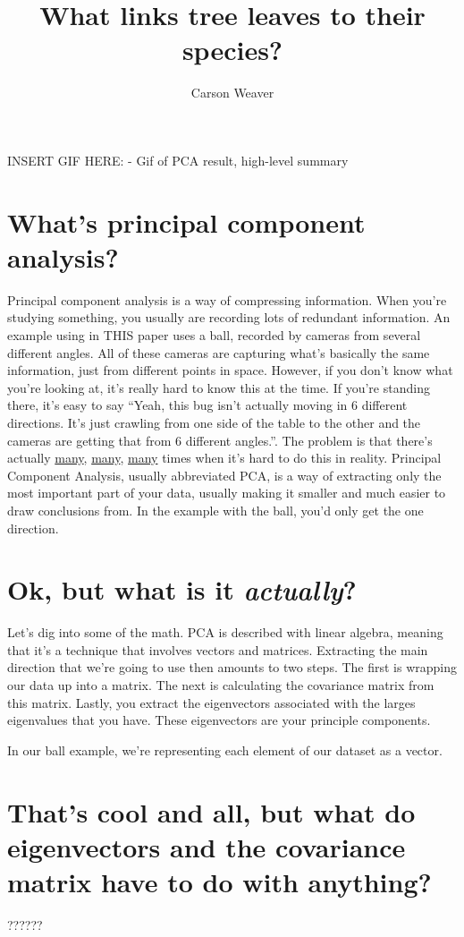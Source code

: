 \documentclass{article}
\title{What links tree leaves to their species?}
\author{Carson Weaver}
\begin{document}
\maketitle

INSERT GIF HERE:
- Gif of PCA result, high-level summary

\section*{What's principal component analysis?}

Principal component analysis is a way of compressing information.
When you're studying something, you usually are recording lots of redundant information.
An example using in THIS paper uses a ball, recorded by cameras from several different angles.
All of these cameras are capturing what's basically the same information, just from different points in space.
However, if you don't know what you're looking at, it's really hard to know this at the time.
If you're standing there, it's easy to say ``Yeah, this bug isn't actually moving in 6 different directions. It's just crawling from one side of the table to the other and the cameras are getting that from 6 different angles.''.
The problem is that there's actually \href{link}{many}, \href{link}{many}, \href{link}{many} times when it's hard to do this in reality.
Principal Component Analysis, usually abbreviated PCA, is a way of extracting only the most important part of your data, usually making it smaller and much easier to draw conclusions from.
In the example with the ball, you'd only get the one direction.

\section*{Ok, but what is it \textit{actually}?}

Let's dig into some of the math.
PCA is described with linear algebra, meaning that it's a technique that involves vectors and matrices.
Extracting the main direction that we're going to use then amounts to two steps.
The first is wrapping our data up into a matrix.
The next is calculating the covariance matrix from this matrix.
Lastly, you extract the eigenvectors associated with the larges eigenvalues that you have.
These eigenvectors are your principle components.

In our ball example, we're representing each element of our dataset as a vector.

\section*{That's cool and all, but what do eigenvectors and the covariance matrix have to do with anything?}
??????
	
\end{document}
